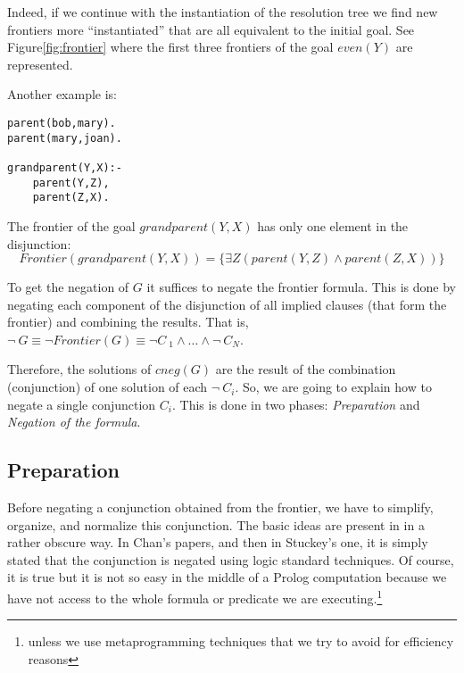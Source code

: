 \documentclass{tlp}
\begin{document}
Indeed, if we continue with the instantiation of the resolution tree we find
new frontiers more ``instantiated'' that are all equivalent to the initial
goal. See Figure\ref{fig:frontier} where the first three frontiers of the goal
$even(Y)$ are represented.

Another example is:
{\small
\begin{verbatim}
parent(bob,mary).
parent(mary,joan).

grandparent(Y,X):- 
    parent(Y,Z),
    parent(Z,X).
\end{verbatim}
}

The frontier of the goal $grandparent (Y,X)$ has only one element in the
disjunction:
\[Frontier(grandparent(Y,X)) = \{ \exists Z (parent(Y,Z) \wedge parent(Z,X) ) \} \] 

To get the negation of $G$ it suffices to negate the frontier
formula. This is done by negating each component of the disjunction of
all implied clauses (that form the frontier) and combining the
results. That is, $\neg ~ G \equiv \neg Frontier(G) \equiv \neg C~ _1
\wedge \ldots \wedge \neg~  C_N$.


Therefore, the solutions of $cneg(G)$ are the result of the
combination (conjunction) of one solution of each $\neg ~ C_i$. So, we
are going to explain how to negate a single conjunction $C_i$. This is
done in two phases: \emph{Preparation} and \emph{Negation of the
formula}.



\vspace{-0.1in}

\subsection{Preparation}
\label{preparation}


Before negating a conjunction obtained from the frontier, we have to
simplify, organize, and normalize this conjunction. The basic ideas are
present in \cite{Chan1} in a rather obscure way. In Chan's papers,
and then in Stuckey's one, it is simply stated that the conjunction is negated
using logic standard techniques. Of course, it is true but it is not so
easy in the middle of a Prolog computation because we have not
access to the whole formula or predicate we are executing.\footnote{unless 
we use metaprogramming techniques that we try to avoid for efficiency reasons}
\end{document}
